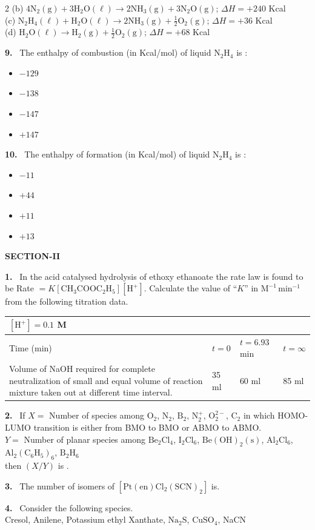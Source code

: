 \documentclass[10pt]{extarticle}
\newcommand{\sect}[1]{\par\smallskip\noindent\textbf{#1}\par}
\newcommand{\qn}[1]{\par\smallskip\noindent\textbf{#1.}~}
\newenvironment{qoptions}{\begin{itemize}[leftmargin=1.8em,itemsep=1pt,topsep=2pt,label={}]}{\end{itemize}}
\newcommand{\opt}[2]{\item[(#1)] #2}
\begin{document}
\begin{multicols}{2}
(b) $\mathrm{4N_2(g)+3H_2O(\ell)\to 2NH_3(g)+3N_2O(g)}$; $\Delta H=+240$ Kcal\\
(c) $\mathrm{N_2H_4(\ell)+H_2O(\ell)\to 2NH_3(g)+\tfrac12O_2(g)}$; $\Delta H=+36$ Kcal\\
(d) $\mathrm{H_2O(\ell)\to H_2(g)+\tfrac12O_2(g)}$; $\Delta H=+68$ Kcal
\qn{9} The enthalpy of combustion (in Kcal/mol) of liquid $\mathrm{N_2H_4}$ is :
\begin{qoptions}
\opt{A}{$-129$}
\opt{B}{$-138$}
\opt{C}{$-147$}
\opt{D}{$+147$}
\end{qoptions}
\qn{10} The enthalpy of formation (in Kcal/mol) of liquid $\mathrm{N_2H_4}$ is :
\begin{qoptions}
\opt{A}{$-11$}
\opt{B}{$+44$}
\opt{C}{$+11$}
\opt{D}{$+13$}
\end{qoptions}
\columnbreak
\sect{SECTION-II}
\qn{1} In the acid catalysed hydrolysis of ethoxy ethanoate the rate law is found to be Rate $=K[\mathrm{CH_3COOC_2H_5}][\mathrm{H^+}]$. Calculate the value of ``$K$'' in $\mathrm{M^{-1}\,min^{-1}}$ from the following titration data.\par\smallskip
{\footnotesize\setlength{\tabcolsep}{3pt}\begin{tabular}{|p{3.0cm}|l|l|l|}
\hline
\multicolumn{4}{|l|}{$[\mathrm{H^+}]=0.1$ M}\\
\hline
Time (min) & $t=0$ & $t=6.93$ min & $t=\infty$\\
\hline
Volume of NaOH required for complete neutralization of small and equal volume of reaction mixture taken out at different time interval. & 35 ml & 60 ml & 85 ml\\
\hline
\end{tabular}}
\qn{2} If $X=$ Number of species among $\mathrm{O_2}$, $\mathrm{N_2}$, $\mathrm{B_2}$, $\mathrm{N_2^+}$, $\mathrm{O_2^{2-}}$, $\mathrm{C_2}$ in which HOMO-LUMO transition is either from BMO to BMO or ABMO to ABMO.\\
$Y=$ Number of planar species among $\mathrm{Be_2Cl_4}$, $\mathrm{I_2Cl_6}$, $\mathrm{Be(OH)_2(s)}$, $\mathrm{Al_2Cl_6}$, $\mathrm{Al_2(C_6H_5)_6}$, $\mathrm{B_2H_6}$\\
then $(X/Y)$ is \underline{\hspace{1cm}}.
\qn{3} The number of isomers of $\mathrm{[Pt(en)Cl_2(SCN)_2]}$ is\underline{\hspace{1cm}}.
\qn{4} Consider the following species.\\
Cresol, Anilene, Potassium ethyl Xanthate, $\mathrm{Na_2S}$, $\mathrm{CuSO_4}$, NaCN\\

\end{multicols}
\end{document}

